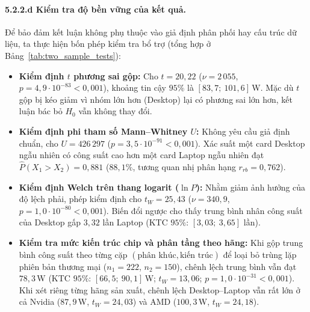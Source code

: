 \documentclass[12pt, a4paper]{article}
\begin{document}
\paragraph{5.2.2.d Kiểm tra độ bền vững của kết quả.}
Để bảo đảm kết luận không phụ thuộc vào giả định phân phối hay cấu trúc dữ liệu, ta thực hiện bốn phép kiểm tra bổ trợ (tổng hợp ở Bảng~\ref{tab:two_sample_tests}):
\begin{itemize}
  \item \textbf{Kiểm định $t$ phương sai gộp:} Cho $t = 20{,}22$ ($\nu = 2\,055$, $p = 4{,}9 \cdot 10^{-83} < 0{,}001$), khoảng tin cậy $95\%$ là $[83{,}7;\ 101{,}6]$\,W. Mặc dù $t$ gộp bị kéo giảm vì nhóm lớn hơn (Desktop) lại có phương sai lớn hơn, kết luận bác bỏ $H_0$ vẫn không thay đổi.
  \item \textbf{Kiểm định phi tham số Mann--Whitney $U$:} Không yêu cầu giả định chuẩn, cho $U = 426\,297$ ($p = 3{,}5 \cdot 10^{-91} < 0{,}001$). Xác suất một card Desktop ngẫu nhiên có công suất cao hơn một card Laptop ngẫu nhiên đạt $\hat{P}(X_1 > X_2) = 0{,}881$ ($88{,}1\%$, tương quan nhị phân hạng $r_{rb} = 0{,}762$).
  \item \textbf{Kiểm định Welch trên thang logarit ($\ln P$):} Nhằm giảm ảnh hưởng của độ lệch phải, phép kiểm định cho $t_W = 25{,}43$ ($\nu = 340{,}9$, $p = 1{,}0 \cdot 10^{-80} < 0{,}001$). Biến đổi ngược cho thấy trung bình nhân công suất của Desktop gấp $3{,}32$ lần Laptop (KTC $95\%$: $[3{,}03;\ 3{,}65]$ lần).
  \item \textbf{Kiểm tra mức kiến trúc chip và phân tầng theo hãng:} Khi gộp trung bình công suất theo từng cặp $(\text{phân khúc}, \text{kiến trúc})$ để loại bỏ trùng lặp phiên bản thương mại ($n_1 = 222$, $n_2 = 150$), chênh lệch trung bình vẫn đạt $78{,}3$\,W (KTC $95\%$: $[66{,}5;\ 90{,}1]$\,W; $t_W = 13{,}06$; $p = 1{,}0 \cdot 10^{-31} < 0{,}001$). Khi xét riêng từng hãng sản xuất, chênh lệch Desktop--Laptop vẫn rất lớn ở cả Nvidia ($87{,}9$\,W, $t_W = 24{,}03$) và AMD ($100{,}3$\,W, $t_W = 24{,}18$).
\end{itemize}
\end{document}
